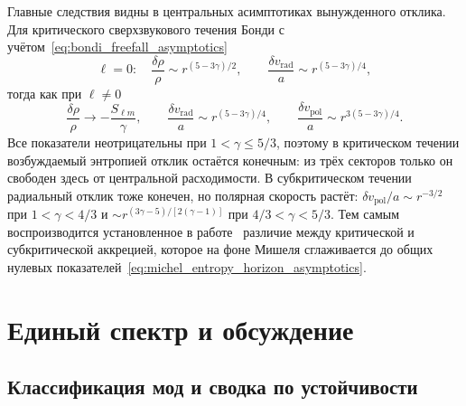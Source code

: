 \documentclass[12pt,a4paper,preprint,nopreprintline]{elsarticle}
\begin{document}
Главные следствия видны в центральных асимптотиках вынужденного отклика. Для критического сверхзвукового течения Бонди с учётом~\eqref{eq:bondi_freefall_asymptotics}
\begin{equation}
    \ell=0:
    \quad
    \frac{\delta\rho}{\rho}
    \sim r^{(5-3\gamma)/2},
    \qquad
    \frac{\delta v_{\mathrm{rad}}}{a}
    \sim r^{(5-3\gamma)/4},
    \label{eq:entropy_critical_radial}
\end{equation}
тогда как при $\ell\neq0$
\begin{equation}
    \frac{\delta\rho}{\rho}
    \longrightarrow-\frac{S_{\ell m}}{\gamma},
    \qquad
    \frac{\delta v_{\mathrm{rad}}}{a}
    \sim r^{(5-3\gamma)/4},
    \qquad
    \frac{\delta v_{\mathrm{pol}}}{a}
    \sim r^{3(5-3\gamma)/4}.
    \label{eq:entropy_critical_nonradial}
\end{equation}
Все показатели неотрицательны при $1<\gamma\leq5/3$, поэтому в критическом течении возбуждаемый энтропией отклик остаётся конечным: из трёх секторов только он свободен здесь от центральной расходимости. В субкритическом течении радиальный отклик тоже конечен, но полярная скорость растёт: $\delta v_{\mathrm{pol}}/a\sim r^{-3/2}$ при $1<\gamma<4/3$ и $\sim r^{(3\gamma-5)/[2(\gamma-1)]}$ при $4/3<\gamma<5/3$. Тем самым воспроизводится установленное в работе~\cite{KovalenkoIG_EreminMA_SpatialInstabilityOfSphericalAccretion_1998} различие между критической и субкритической аккрецией, которое на фоне Мишеля сглаживается до общих нулевых показателей~\eqref{eq:michel_entropy_horizon_asymptotics}.

\section{Единый спектр и обсуждение}
\label{sec:discussion}

\subsection{Классификация мод и сводка по устойчивости}
\label{sec:unified_classification}
\end{document}
